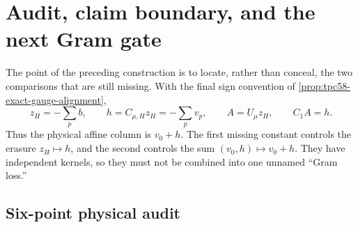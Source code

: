 \section{Audit, claim boundary, and the next Gram gate}
\label{sec:tpc58-claims-next}

The point of the preceding construction is to locate, rather than conceal,
the two comparisons that are still missing.  With the final sign convention
of \cref{prop:tpc58-exact-gauge-alignment},
\begin{equation}
 z_H=-\sum_p b,
 \qquad
 h=C_{\mu,H}z_H=-\sum_pv_p,
 \qquad
 A=U_\mu z_H,
 \qquad
 C_1A=h.
 \label{eq:tpc58-final-sign-ledger}
\end{equation}
Thus the physical affine column is \(v_0+h\).  The first missing constant
controls the erasure \(z_H\mapsto h\), and the second controls the sum
\((v_0,h)\mapsto v_0+h\).  They have independent kernels, so they must not
be combined into one unnamed ``Gram loss.''

\subsection{Six-point physical audit}

